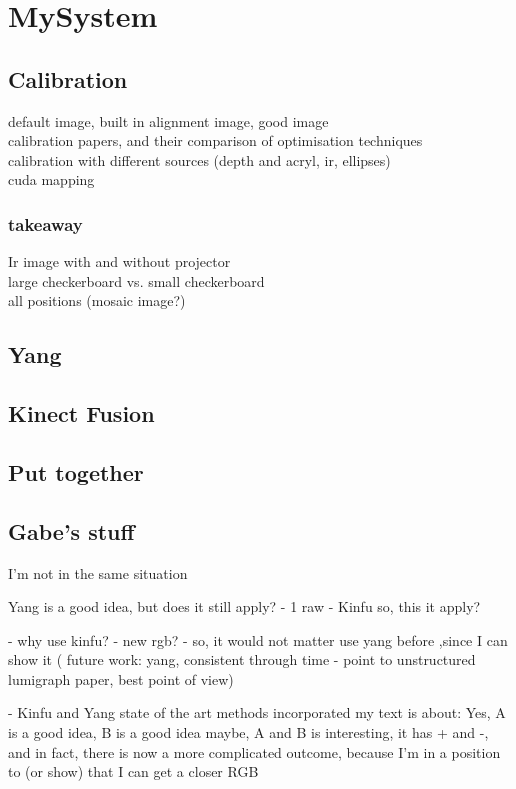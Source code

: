 \section{MySystem}

\subsection{Calibration}
default image, built in alignment image, good image\\
calibration papers, and their comparison of optimisation techniques\\
calibration with different sources (depth and acryl, ir, ellipses)\\
cuda mapping\\
\subsubsection{takeaway}
Ir image with and without projector\\
large checkerboard vs. small checkerboard\\
all positions (mosaic image?)\\

\subsection{Yang}
\subsection{Kinect Fusion}
\subsection{Put together}


\subsection{Gabe's stuff}

I'm not in the same situation

Yang is a good idea, but does it still apply?
    - 1 raw
    - Kinfu
    so, this it apply?
    
    - why use kinfu? - new rgb?
    - so, it would not matter use yang before ,since I can show it ( future work:  yang, consistent through time - point to unstructured lumigraph paper, best point of view)
    
- Kinfu and Yang state of the art methods incorporated
my text is about: Yes, A is a good idea, B is a good idea maybe, A and B is interesting, it has + and -, and in fact, there is now a more complicated outcome, because I'm in a position to (or show) that I can get a closer RGB 

